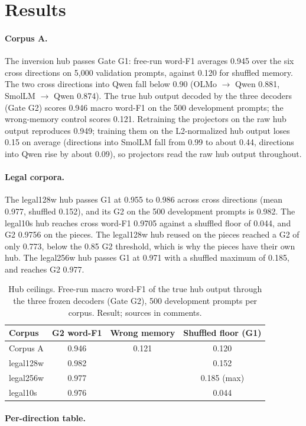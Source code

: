 \section{Results}\label{sec:hub:results}

\paragraph{Corpus A.} The inversion hub passes Gate G1: free-run word-F1 averages 0.945 over the six cross directions on 5,000 validation prompts, against 0.120 for shuffled memory. The two cross directions into Qwen fall below 0.90 (OLMo $\to$ Qwen 0.881, SmolLM $\to$ Qwen 0.874). The true hub output decoded by the three decoders (Gate G2) scores 0.946 macro word-F1 on the 500 development prompts; the wrong-memory control scores 0.121. Retraining the projectors on the raw hub output reproduces 0.949; training them on the L2-normalized hub output loses 0.15 on average (directions into SmolLM fall from 0.99 to about 0.44, directions into Qwen rise by about 0.09), so projectors read the raw hub output throughout.

\paragraph{Legal corpora.} The legal128w hub passes G1 at 0.955 to 0.986 across cross directions (mean 0.977, shuffled 0.152), and its G2 on the 500 development prompts is 0.982. The legal10s hub reaches cross word-F1 0.9705 against a shuffled floor of 0.044, and G2 0.9756 on the pieces. The legal128w hub reused on the pieces reached a G2 of only 0.773, below the 0.85 G2 threshold, which is why the pieces have their own hub. The legal256w hub passes G1 at 0.971 with a shuffled maximum of 0.185, and reaches G2 0.977.

\begin{table}[H]
\caption{Hub ceilings. Free-run macro word-F1 of the true hub output through the three frozen decoders (Gate G2), 500 development prompts per corpus. Result; sources in comments.}
\label{tab:hub:g2}
\centering
\begin{tabular}{lccc}
\toprule
Corpus & G2 word-F1 & Wrong memory & Shuffled floor (G1) \\
\midrule
Corpus A & 0.946 & 0.121 & 0.120 \\ %
legal128w & 0.982 & \todo{} & 0.152 \\ %
legal256w & 0.977 & \todo{} & 0.185 (max) \\ %
legal10s & 0.976 & \todo{} & 0.044 \\ %
\bottomrule
\end{tabular}
\end{table}

\paragraph{Per-direction table.} 
